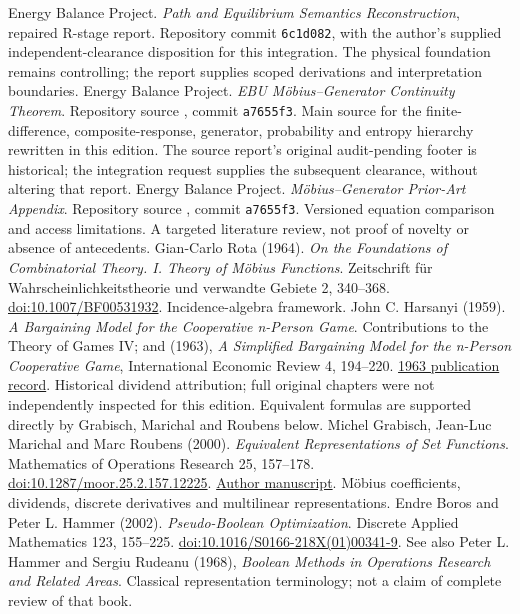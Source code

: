  Energy Balance Project. \emph{Path and Equilibrium Semantics Reconstruction}, repaired R-stage report. Repository commit \texttt{6c1d082}, with the author's supplied independent-clearance disposition for this integration. The physical foundation remains controlling; the report supplies scoped derivations and interpretation boundaries.
 Energy Balance Project. \emph{EBU M\"obius--Generator Continuity Theorem}. Repository source , commit \texttt{a7655f3}. Main source for the finite-difference, composite-response, generator, probability and entropy hierarchy rewritten in this edition. The source report's original audit-pending footer is historical; the integration request supplies the subsequent clearance, without altering that report.
 Energy Balance Project. \emph{M\"obius--Generator Prior-Art Appendix}. Repository source , commit \texttt{a7655f3}. Versioned equation comparison and access limitations. A targeted literature review, not proof of novelty or absence of antecedents.
 Gian-Carlo Rota (1964). \emph{On the Foundations of Combinatorial Theory. I. Theory of M\"obius Functions}. Zeitschrift f\"ur Wahrscheinlichkeitstheorie und verwandte Gebiete 2, 340--368. \href{https://doi.org/10.1007/BF00531932}{doi:10.1007/BF00531932}. Incidence-algebra framework.
 John C. Harsanyi (1959). \emph{A Bargaining Model for the Cooperative n-Person Game}. Contributions to the Theory of Games IV; and (1963), \emph{A Simplified Bargaining Model for the n-Person Cooperative Game}, International Economic Review 4, 194--220. \href{https://www.jstor.org/stable/2525487}{1963 publication record}. Historical dividend attribution; full original chapters were not independently inspected for this edition. Equivalent formulas are supported directly by Grabisch, Marichal and Roubens below.
 Michel Grabisch, Jean-Luc Marichal and Marc Roubens (2000). \emph{Equivalent Representations of Set Functions}. Mathematics of Operations Research 25, 157--178. \href{https://doi.org/10.1287/moor.25.2.157.12225}{doi:10.1287/moor.25.2.157.12225}. \href{https://ikojadin.perso.univ-pau.fr/kappalab/pub/GraMarRouMOR2000.pdf}{Author manuscript}. M\"obius coefficients, dividends, discrete derivatives and multilinear representations.
 Endre Boros and Peter L. Hammer (2002). \emph{Pseudo-Boolean Optimization}. Discrete Applied Mathematics 123, 155--225. \href{https://doi.org/10.1016/S0166-218X(01)00341-9}{doi:10.1016/S0166-218X(01)00341-9}. See also Peter L. Hammer and Sergiu Rudeanu (1968), \emph{Boolean Methods in Operations Research and Related Areas}. Classical representation terminology; not a claim of complete review of that book.

